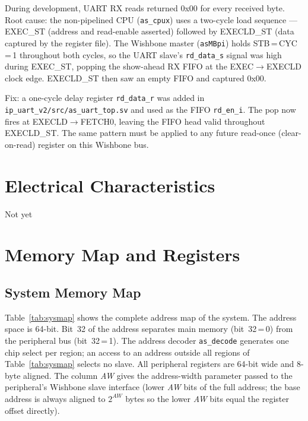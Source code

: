During development, UART RX reads returned 0x00 for every received byte.
Root cause: the non-pipelined CPU (\texttt{as\_cpux}) uses a two-cycle load
sequence --- EXEC\_ST (address and read-enable asserted) followed by EXECLD\_ST
(data captured by the register file).
The Wishbone master (\texttt{asMBpi}) holds STB\,=\,CYC\,=\,1 throughout both
cycles, so the UART slave's \texttt{rd\_data\_s} signal was high during EXEC\_ST,
popping the show-ahead RX FIFO at the EXEC$\to$EXECLD clock edge.
EXECLD\_ST then saw an empty FIFO and captured 0x00.

Fix: a one-cycle delay register \texttt{rd\_data\_r} was added in
\texttt{ip\_uart\_v2/src/as\_uart\_top.sv} and used as the FIFO \texttt{rd\_en\_i}.
The pop now fires at EXECLD$\to$FETCH0, leaving the FIFO head valid throughout
EXECLD\_ST.
The same pattern must be applied to any future read-once (clear-on-read) register
on this Wishbone bus.

\chapter{Electrical Characteristics}
Not yet

\chapter{Memory Map and Registers}
\label{ch:memmap}

\section{System Memory Map}
\label{sec:sysmap}

Table~\ref{tab:sysmap} shows the complete address map of the \aschip{} system.
The address space is 64-bit.
Bit~32 of the address separates main memory (bit~32\,=\,0) from the peripheral
bus (bit~32\,=\,1). The address decoder \texttt{as\_decode} generates one
chip select per region; an access to an address outside all regions of
Table~\ref{tab:sysmap} selects no slave.
All peripheral registers are 64-bit wide and 8-byte aligned.
The column \textit{AW} gives the address-width parameter passed to the
peripheral's Wishbone slave interface (lower \textit{AW} bits of the full
address; the base address is always aligned to $2^{AW}$ bytes so the lower
\textit{AW} bits equal the register offset directly).


